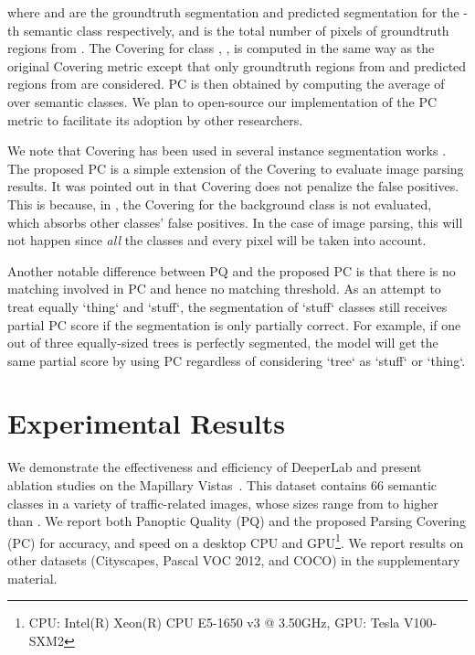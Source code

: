 \documentclass[10pt,twocolumn,letterpaper]{article}
\begin{document}
where  and  are the groundtruth segmentation and predicted segmentation for the -th semantic class respectively, and  is the total number of pixels of groundtruth regions from . The Covering for class , , is computed in the same way as the original Covering metric except that only groundtruth regions from  and predicted regions from  are considered. PC is then obtained by computing the average of  over  semantic classes. We plan to open-source our implementation of the PC metric to facilitate its adoption by other researchers.

We note that Covering has been used in several instance segmentation works \cite{silberman2014instance,zhang2015monocular,zhang2016instance,ren2017end,liu2017sgn}. The proposed PC is a simple extension of the Covering to evaluate image parsing results. It was pointed out in \cite{zhang2016instance} that Covering does not penalize the false positives. This is because, in \cite{zhang2016instance}, the Covering for the background class is not evaluated, which absorbs other classes' false positives. In the case of image parsing, this will not happen since \textit{all} the classes and every pixel will be taken into account.

Another notable difference between PQ and the proposed PC is that there is no matching involved in PC and hence no matching threshold. As an attempt to treat equally `thing` and `stuff`, the segmentation of `stuff` classes still receives partial PC score if the segmentation is only partially correct. For example, if one out of three equally-sized trees is perfectly segmented, the model will get the same partial score by using PC regardless of considering `tree` as `stuff` or `thing`. 
\section{Experimental Results}
\label{sec:experiments}

We demonstrate the effectiveness and efficiency of DeeperLab and present ablation studies on the Mapillary Vistas~\cite{neuhold2017mapillary}. This dataset contains 66 semantic classes in a variety of traffic-related images, whose sizes range from  to higher than . We report both Panoptic Quality (PQ) \cite{kirillov2018panoptic} and the proposed Parsing Covering (PC) for accuracy, and speed on a desktop CPU and GPU\footnote{CPU: Intel(R) Xeon(R) CPU E5-1650 v3 @ 3.50GHz, GPU: Tesla V100-SXM2}. We report results on other datasets (Cityscapes, Pascal VOC 2012, and COCO) in the supplementary material.
\end{document}
